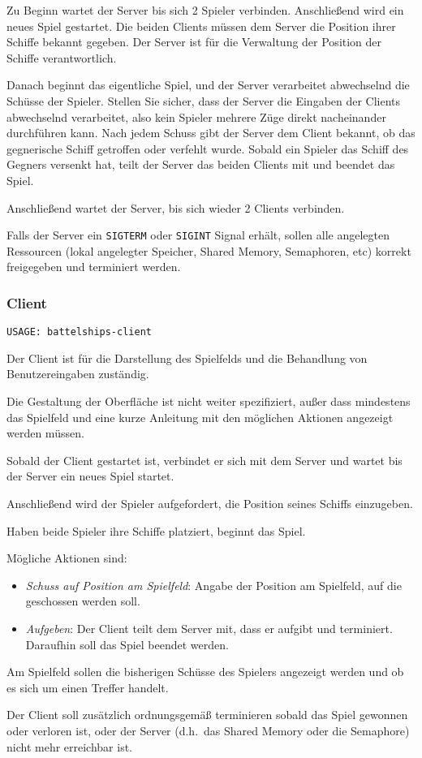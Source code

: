 Zu Beginn wartet der Server bis sich 2 Spieler verbinden. Anschließend wird ein
neues Spiel gestartet. Die beiden Clients müssen dem Server die Position ihrer
Schiffe bekannt gegeben. Der Server ist für die Verwaltung der Position der
Schiffe verantwortlich.

Danach beginnt das eigentliche Spiel, und der Server verarbeitet abwechselnd
die Schüsse der Spieler. Stellen Sie sicher, dass der Server die Eingaben der
Clients abwechselnd verarbeitet, also kein Spieler mehrere Züge direkt
nacheinander durchführen kann. Nach jedem Schuss gibt der Server dem Client
bekannt, ob das gegnerische Schiff getroffen oder verfehlt wurde. Sobald ein
Spieler das Schiff des Gegners versenkt hat, teilt der Server das beiden
Clients mit und beendet das Spiel.

Anschließend wartet der Server, bis sich wieder 2 Clients verbinden.

Falls der Server ein \verb|SIGTERM| oder \verb|SIGINT| Signal erhält, sollen
alle angelegten Ressourcen (lokal angelegter Speicher, Shared Memory,
Semaphoren, etc) korrekt freigegeben und terminiert werden.

\subsubsection*{Client}

\begin{verbatim}
USAGE: battelships-client
\end{verbatim}

Der Client ist für die Darstellung des Spielfelds und die Behandlung von
Benutzereingaben zuständig.

Die Gestaltung der Oberfläche ist nicht weiter spezifiziert, außer dass
mindestens das Spielfeld und eine kurze Anleitung mit den möglichen Aktionen
angezeigt werden müssen.

Sobald der Client gestartet ist, verbindet er sich mit dem Server und wartet
bis der Server ein neues Spiel startet.

Anschließend wird der Spieler aufgefordert, die Position seines Schiffs
einzugeben.

Haben beide Spieler ihre Schiffe platziert, beginnt das Spiel.

Mögliche Aktionen sind:

\begin{itemize}
  \item \emph{Schuss auf Position am Spielfeld}: Angabe der Position am
    Spielfeld, auf die geschossen werden soll.
  \item \emph{Aufgeben}: Der Client teilt dem Server mit, dass er aufgibt
    und terminiert.  Daraufhin soll das Spiel beendet werden.
\end{itemize}

Am Spielfeld sollen die bisherigen Schüsse des Spielers angezeigt werden und ob
es sich um einen Treffer handelt.

Der Client soll zusätzlich ordnungsgemäß terminieren sobald das Spiel gewonnen
oder verloren ist, oder der Server (d.h.\ das Shared Memory oder die Semaphore)
nicht mehr erreichbar ist.

\osueguidelinesthree


